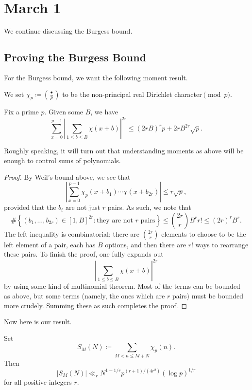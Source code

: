 \documentclass[../notes.tex]{subfiles}
\begin{document}
\section{March 1}

We continue discussing the Burgess bound.

\subsection{Proving the Burgess Bound}
For the Burgess bound, we want the following moment result.
\begin{notation}
	We set $\chi_p\coloneqq\left(\frac\bullet p\right)$ to be the non-principal real Dirichlet character$\pmod p$.
\end{notation}
\begin{lemma} \label{lem:moment-of-char-sum}
	Fix a prime $p$. Given some $B$, we have
	\[\sum_{x=0}^{p-1}\left|\sum_{1\le b\le B}\chi(x+b)\right|^{2r}\le(2rB)^rp+2rB^{2r}\sqrt p.\]
\end{lemma}
Roughly speaking, it will turn out that understanding moments as above will be enough to control sums of polynomials.
\begin{proof}
	By Weil's bound above, we see that
	\[\left|\sum_{x=0}^{p-1}\chi_p(x+b_1)\cdots\chi(x+b_{2r})\right|\le r\sqrt p,\]
	provided that the $b_i$ are not just $r$ pairs. As such, we note that
	\[\#\left\{(b_1,\ldots,b_{2r})\in[1,B]^{2r}:\text{they are not }r\text{ pairs}\right\}\le\binom{2r}rB^rr!\le(2r)^rB^r.\]
	The left inequality is combinatorial: there are $\binom{2r}r$ elements to choose to be the left element of a pair, each has $B$ options, and then there are $r!$ ways to rearrange these pairs. To finish the proof, one fully expands out
	\[\left|\sum_{1\le b\le B}\chi(x+b)\right|^{2r}\]
	by using some kind of multinomial theorem. Most of the terms can be bounded as above, but some terms (namely, the ones which are $r$ pairs) must be bounded more crudely. Summing these as such completes the proof.
\end{proof}
Now here is our result.
\begin{theorem}[Burgess]
	Set
	\[S_M(N)\coloneqq\sum_{M<n\le M+N}\chi_p(n).\]
	Then
	\[|S_M(N)|\ll_rN^{1-1/r}p^{(r+1)/\left(4r^2\right)}(\log p)^{1/r}\]
	for all positive integers $r$.
\end{theorem}
\end{document}
